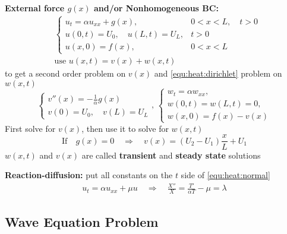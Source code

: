 \documentclass[10pt,leqno]{article}
\begin{document}
\begin{multicols}{2}
\textbf{External force $g(x)$ and/or Nonhomogeneous BC:} 
\begin{align}
    &\left\{ \begin{array}{ll}
            u_{t} = \alpha u_{xx} + g(x), & 0<x<L, \quad t>0 \\
            u(0,t) = U_0, \quad u(L,t)= U_L, & t>0 \\
            u(x,0) = f(x), & 0<x<L
    \end{array}\right. \\
    &\text{use\ } u(x,t)=v(x)+w(x,t)
\end{align}
to get a second order problem on $v(x)$ and \eqref{equ:heat:dirichlet} problem on $w(x,t)$ 
\begin{equation}
    \left\{ \begin{array}{l}
        v''(x) = -\tfrac{1}{\alpha}g(x) \\
        v(0) = U_{0}, \quad v(L)= U_{L}
    \end{array}\right., \,
    \left\{ \begin{array}{l}
            w_{t} = \alpha w_{xx}, \\
            w(0,t) = w(L,t)= 0, \\
            w(x,0) = f(x) - v(x)
    \end{array}\right.
\end{equation}
First solve for $v(x)$, then use it to solve for $w(x,t)$
\begin{equation}
\text{If}\quad g(x)=0 \quad \Rightarrow \quad v(x)=(U_{2}-U_{1})\frac{x}{L}+U_{1} 
\end{equation}
$w(x, t)$ and $v(x)$ are called \textbf{transient} and \textbf{steady state} solutions

\textbf{Reaction-diffusion:} put all constants on the $t$ side of \eqref{equ:heat:normal}
\begin{align}
 u_{t}=\alpha u_{xx} + \mu u \quad \Rightarrow \quad \frac{X''}{X} = \frac{T'}{\alpha T} -\mu = \lambda
\end{align}


\end{multicols}


\newpage

\begin{center}
\section*{Wave Equation Problem}
\end{center}
\end{document}
